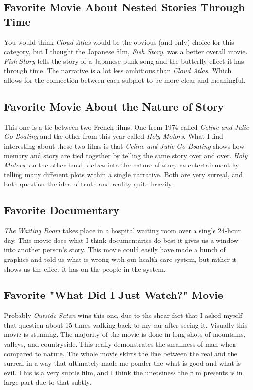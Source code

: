 \documentclass[11pt]{article}
\begin{document}
\subsection{Favorite Movie About Nested Stories Through Time}
You would think \emph{Cloud Atlas} would be the obvious (and only) choice for this category, but I thought the Japanese film, \emph{Fish Story}, was a better overall movie. \emph{Fish Story} tells the story of a Japanese punk song and the butterfly effect it has through time. The narrative is a lot less ambitious than \emph{Cloud Atlas}. Which allows for the connection between each subplot to be more clear and meaningful.

\subsection{Favorite Movie About the Nature of Story}
This one is a tie between two French films. One from 1974 called \emph{Celine and Julie Go Boating} and the other from this year called \emph{Holy Motors}. What I find interesting about these two films is that \emph{Celine and Julie Go Boating} shows how memory and story are tied together by telling the same story over and over. \emph{Holy Motors}, on the other hand, delves into the nature of story as entertainment by telling many different plots within a single narrative. Both are very surreal, and both question the idea of truth and reality quite heavily.

\subsection{Favorite Documentary}
\emph{The Waiting Room} takes place in a hospital waiting room over a single 24-hour day. This movie does what I think documentaries do best it gives us a window into another person's story. This movie could easily have made a bunch of graphics and told us what is wrong with our health care system, but rather it shows us the effect it has on the people in the system.


\subsection{Favorite "What Did I Just Watch?" Movie}
Probably \emph{Outside Satan} wins this one, due to the shear fact that I asked myself that question about 15 times walking back to my car after seeing it. Visually this movie is stunning. The majority of the movie is done in long shots of mountains, valleys, and countryside. This really demonstrates the smallness of man when compared to nature. The whole movie skirts the line between the real and the surreal in a way that ultimately made me ponder the what is good and what is evil. This is a very subtle film, and I think the uneasiness the film presents is in large part due to that subtly.
\end{document}
